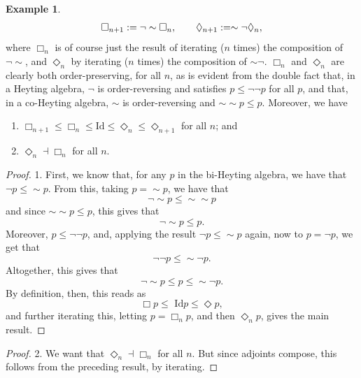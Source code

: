 \documentclass[11pt]{book}
\theoremstyle{definition}
\newtheorem{example}{Example}[section]
\theoremstyle{definition}
\theoremstyle{definition}
\theoremstyle{theorem}
\theoremstyle{definition}
\begin{document}
\begin{example}
	\begin{equation*}
	\Box_{n+1} := \neg \sim \Box_n, \hspace*{2em} \Diamond_{n+1} :=  \sim \neg \Diamond_n,
	\end{equation*}
	where $\Box_n$ is of course just the result of iterating ($n$ times) the composition of $\neg \sim$, and $\Diamond_n$ by iterating ($n$ times) the composition of $\sim \neg$. $\Box_n$ and $\Diamond_n$ are clearly both order-preserving, for all $n$, as is evident from the double fact that, in a Heyting algebra, $\neg$ is order-reversing and satisfies $p \leq \neg \neg p$ for all $p$, and that, in a co-Heyting algebra, $\sim$ is order-reversing and $\sim \sim p \leq p$. Moreover, we have 
	\begin{enumerate}
		\item $\Box_{n+1} \leq \Box_n \leq \text{Id} \leq \Diamond_n \leq \Diamond_{n+1}$ for all $n$; and 
		\item $\Diamond_n \dashv \Box_n$ for all $n$. 
	\end{enumerate}  
	\begin{proof}
		1. First, we know that, for any $p$ in the bi-Heyting algebra, we have that $\neg p \leq \sim p$. From this, taking $p = \sim p$, we have that 
		\begin{equation*}
		\neg \sim p \leq \sim \sim p
		\end{equation*}
		and since $\sim \sim p \leq p$, this gives that 
		\begin{equation*}
		\neg \sim p \leq p. 
		\end{equation*}
		Moreover, $p \leq \neg \neg p$, and, applying the result $\neg p \leq \sim p$ again, now to $p = \neg p$, we get that 
		\begin{equation*}
		\neg \neg p \leq \sim \neg p.
		\end{equation*}
		Altogether, this gives that 
		\begin{equation*}
		\neg \sim p \leq p \leq \sim \neg p. 
		\end{equation*} 
		By definition, then, this reads as 
		\begin{equation*}
		\Box p \leq \text{ Id} p \leq \Diamond p, 
		\end{equation*}
		and further iterating this, letting $p = \Box_n p$, and then $\Diamond_n p$, gives the main result.  
	\end{proof}
	\begin{proof}
		2. We want that $\Diamond_n \dashv \Box_n$ for all $n$. But since adjoints compose, this follows from the preceding result, by iterating.

\end{proof}
\end{example}
\end{document}
